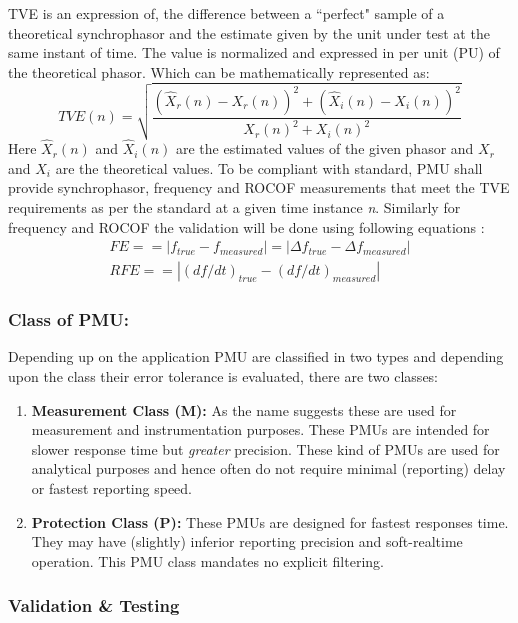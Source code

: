 TVE is an expression of, the difference between a ``perfect" sample of a theoretical synchrophasor and the estimate given by the unit under test at the same instant of time. The value is normalized and expressed in per unit (PU) of the theoretical phasor. Which can be mathematically represented as: 
\begin{equation}
TVE(n) = \sqrt{\frac{ (\hat{X}_r(n) - X_r(n))^2 + (\hat{X}_i(n)-X_i(n))^2} {X_r(n)^2 + X_i(n)^2}}
\end{equation}
Here $ \hat{X}_r (n)$ and $\hat{X}_i(n) $ are the estimated values of the given phasor and $X_r$ and $X_i$ are the theoretical values.
To be compliant with standard, PMU shall provide synchrophasor, frequency and ROCOF measurements that meet the TVE requirements as per the standard at a given time instance \emph{n}. Similarly for frequency and ROCOF the validation will be done using following equations \cite{c37.118}:
\begin{eqnarray}
FE == |f_{true}-f_{measured}| = |\Delta f_{true}-\Delta f_{measured}| \\
RFE == |(df/dt)_{true}-(df/dt)_{measured} |
\end{eqnarray}

\subsubsection{Class of PMU:}
Depending up on the application PMU are classified in two types and depending upon the class their error tolerance is evaluated, there are two classes:
\begin{enumerate}
	\item \textbf{Measurement Class (M):} As the name suggests these are used for measurement and instrumentation purposes. These PMUs are intended for slower response time but \emph{greater} precision. These kind of PMUs are used for analytical purposes and hence often do not require minimal (reporting) delay or fastest reporting speed.
	\item \textbf{Protection Class (P):} These PMUs are designed for fastest responses time. They may have (slightly) inferior reporting precision and soft-realtime operation. This PMU class mandates no explicit filtering.
\end{enumerate} 

\subsubsection{Validation \& Testing }

